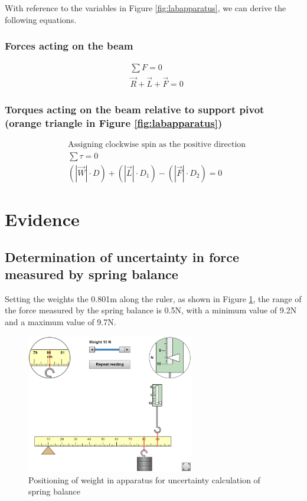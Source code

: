 \documentclass[letterpaper, 12pt]{article}
\begin{document}
With reference to the variables in Figure \ref*{fig:labapparatus}, we can derive the following equations.

\subsubsection*{Forces acting on the beam}
\begin{align*}
     & \sum F                      = 0
    \\
     & \vec{R} + \vec{L} + \vec{F} = 0
\end{align*}

\subsubsection*{Torques acting on the beam relative to support pivot (orange triangle in Figure \ref*{fig:labapparatus})}

\begin{align*}
     & \text{Assigning clockwise spin as the positive direction}
    \\
     & \sum \tau = 0
    \\
     & \left(\left|\vec{W}\right|\cdot D\right) + \left(\left|\vec{L}\right|\cdot D_1\right) - \left(\left|\vec{F}\right|\cdot D_2\right) = 0
\end{align*}

\section{Evidence}

\subsection{Determination of uncertainty in force measured by spring balance}

Setting the weights the 0.801\unit{m} along the ruler, as shown in Figure
\ref*{fig:uncRef}, the range of the force measured by the spring balance is
0.5\unit{N}, with a minimum value of 9.2\unit{N} and a maximum value of
9.7\unit{N}.

\begin{figure}[H]
    \centering
    \includegraphics[width=0.65\textwidth]{uncRef}
    \caption{Positioning of weight in apparatus for uncertainty calculation of spring balance}
    \label{fig:uncRef}
\end{figure}
\end{document}
